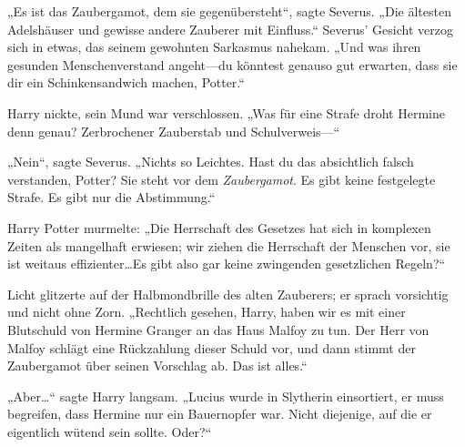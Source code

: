 „Es ist das Zaubergamot, dem sie gegenübersteht“, sagte Severus. „Die ältesten Adelshäuser und gewisse andere Zauberer mit Einfluss.“
Severus’ Gesicht verzog sich in etwas, das seinem gewohnten Sarkasmus nahekam. „Und was ihren gesunden Menschenverstand angeht—du könntest genauso gut erwarten, dass sie dir ein Schinkensandwich machen, Potter.“

Harry nickte, sein Mund war verschlossen.
„Was für eine Strafe droht Hermine denn genau? Zerbrochener Zauberstab und Schulverweis—“

„Nein“, sagte Severus. „Nichts so Leichtes. Hast du das absichtlich falsch verstanden, Potter? Sie steht vor dem \emph{Zaubergamot}. Es gibt keine festgelegte Strafe. Es gibt nur die Abstimmung.“

Harry Potter murmelte: „Die Herrschaft des Gesetzes hat sich in komplexen Zeiten als mangelhaft erwiesen; wir ziehen die Herrschaft der Menschen vor, sie ist weitaus effizienter…Es gibt also gar keine zwingenden gesetzlichen Regeln?“

Licht glitzerte auf der Halbmondbrille des alten Zauberers; er sprach vorsichtig und nicht ohne Zorn. „Rechtlich gesehen, Harry, haben wir es mit einer Blutschuld von Hermine Granger an das Haus Malfoy zu tun. Der Herr von Malfoy schlägt eine Rückzahlung dieser Schuld vor, und dann stimmt der Zaubergamot über seinen Vorschlag ab. Das ist alles.“

„Aber…“ sagte Harry langsam. „Lucius wurde in Slytherin einsortiert, er muss begreifen, dass Hermine nur ein Bauernopfer war. Nicht diejenige, auf die er eigentlich wütend sein sollte. Oder?“

